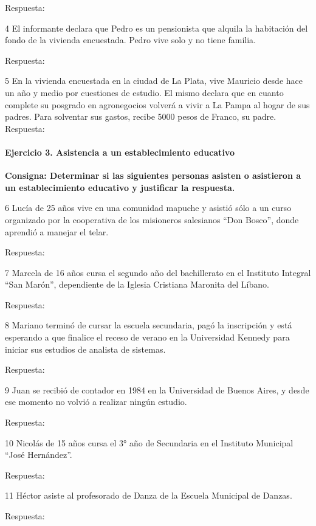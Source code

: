 \documentclass[
  openany]{book}
\begin{document}
Respuesta:

4 El informante declara que Pedro es un pensionista que alquila la habitación del fondo de la vivienda encuestada. Pedro vive solo y no tiene familia.

Respuesta:

5 En la vivienda encuestada en la ciudad de La Plata, vive Mauricio desde hace un año y medio por cuestiones de estudio. El mismo declara que en cuanto complete su posgrado en agronegocios volverá a vivir a La Pampa al hogar de sus padres. Para solventar sus gastos, recibe 5000 pesos de Franco, su padre. Respuesta:

\hypertarget{ejercicio-3.-asistencia-a-un-establecimiento-educativo}{%
\paragraph{Ejercicio 3. Asistencia a un establecimiento educativo}\label{ejercicio-3.-asistencia-a-un-establecimiento-educativo}}

\textbf{Consigna: Determinar si las siguientes personas asisten o asistieron a un establecimiento educativo y justificar la respuesta.}

6 Lucía de 25 años vive en una comunidad mapuche y asistió sólo a un curso organizado por la cooperativa de los misioneros salesianos ``Don Bosco'', donde aprendió a manejar el telar.

Respuesta:

7 Marcela de 16 años cursa el segundo año del bachillerato en el Instituto Integral ``San Marón'', dependiente de la Iglesia Cristiana Maronita del Líbano.

Respuesta:

8 Mariano terminó de cursar la escuela secundaria, pagó la inscripción y está esperando a que finalice el receso de verano en la Universidad Kennedy para iniciar sus estudios de analista de sistemas.

Respuesta:

9 Juan se recibió de contador en 1984 en la Universidad de Buenos Aires, y desde ese momento no volvió a realizar ningún estudio.

Respuesta:

10 Nicolás de 15 años cursa el 3° año de Secundaria en el Instituto Municipal ``José Hernández''.

Respuesta:

11 Héctor asiste al profesorado de Danza de la Escuela Municipal de Danzas.

Respuesta:
\end{document}
